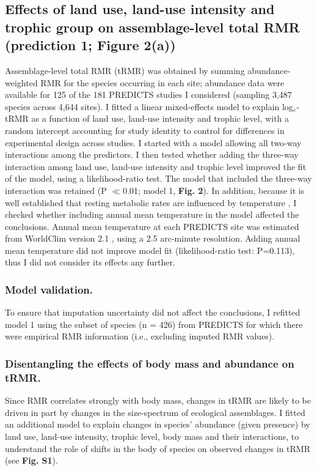\subsection{Effects of land use, land-use intensity and trophic group on assemblage-level total RMR (prediction 1; Figure 2(a))}

Assemblage-level total RMR (tRMR) was obtained by summing abundance-weighted RMR for the species occurring in each site; abundance data were available for 125 of the 181 PREDICTS studies I considered (sampling 3,487 species across 4,644 sites). I fitted a linear mixed-effects model to explain log$_e$-tRMR as a function of land use, land-use intensity and trophic level, with a random intercept accounting for study identity to control for differences in experimental design across studies. I started with a model allowing all two-way interactions among the predictors. I then tested whether adding the three-way interaction among land use, land-use intensity and trophic level improved the fit of the model, using a likelihood-ratio test. The model that included the three-way interaction was retained (P $\ll$0.01; model 1, \textbf{Fig. 2}). In addition, because it is well established that resting metabolic rates are influenced by temperature \citep{Clarke2004a}, I checked whether including annual mean temperature in the model affected the conclusions. Annual mean temperature at each PREDICTS site was estimated from WorldClim version 2.1 \citep{Fick2017}, using a 2.5 arc-minute resolution. Adding annual mean temperature did not improve model fit (likelihood-ratio test: P=0.113), thus I did not consider its effects any further.   

\subsubsection*{Model validation.}
To ensure that imputation uncertainty did not affect the conclusions, I refitted model 1 using the subset of species (n = 426) from PREDICTS for which there were empirical RMR information (i.e., excluding imputed RMR values). 

\subsubsection*{Disentangling the effects of body mass and abundance on tRMR.}
Since RMR correlates strongly with body mass, changes in tRMR are likely to be driven in part by changes in the size-spectrum of ecological assemblages. I fitted an additional model to explain changes in species’ abundance (given presence) by land use, land-use intensity, trophic level, body mass and their interactions, to understand the role of shifts in the body of species on observed changes in tRMR (see \textbf{Fig. S1}).  

